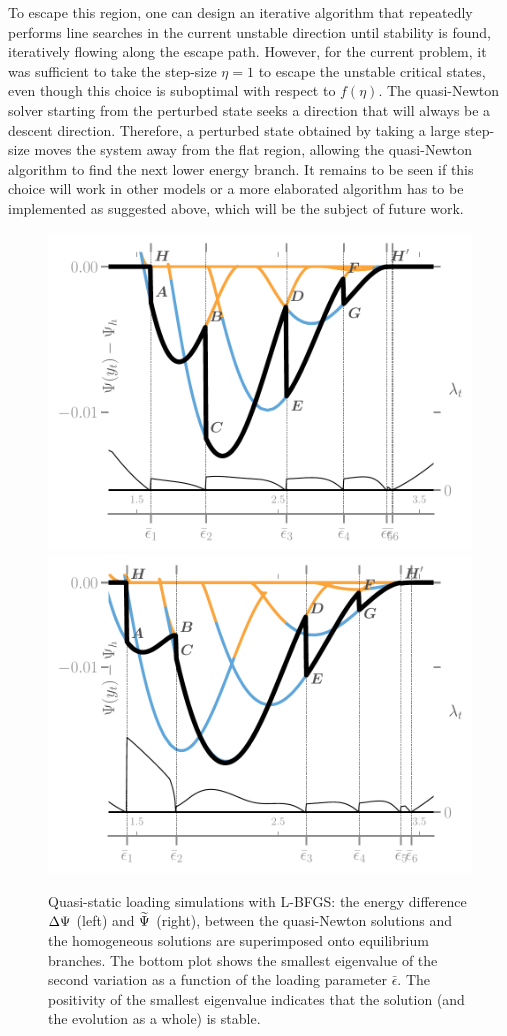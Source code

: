 To escape this region, one can design an iterative algorithm that repeatedly performs line searches in the current unstable direction until stability is found, iteratively flowing along the escape path. However, for the current problem, it was sufficient to take the step-size \( \eta=1 \) to escape the unstable critical states, even though this choice is suboptimal {with respect to} \( f(\eta) \). 
The quasi-Newton solver starting from the perturbed state seeks a direction that will always be a descent direction. Therefore, a perturbed state obtained by taking a large step-size moves the system away from the flat region, allowing the quasi-Newton algorithm to find the next lower energy branch. It remains to be seen if this choice will work in other models or a more elaborated algorithm has to be implemented as suggested above, which will be the subject of future work.
\begin{figure}
    \hspace*{-3cm}
    \includegraphics[width=.7\textwidth]{../images/model_stiff_energy_kick_algo.pdf} 
    \includegraphics[width=.7\textwidth]{../images/model_compliant_energy_kick_algo.pdf}
    \caption{
        Quasi-static loading simulations with L-BFGS: the energy difference $\Delta \Psi$ (left) and $\widetilde\Psi$ (right), between the quasi-Newton solutions and the homogeneous solutions are superimposed onto equilibrium branches. The bottom plot shows the smallest eigenvalue of the second variation as a function of the loading parameter $\bar\epsilon$. The positivity of the smallest eigenvalue indicates that the solution (and the evolution as a whole) is stable.
        }
    \label{fig:tempostable}
\end{figure}


